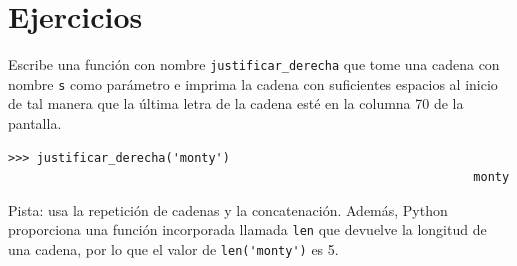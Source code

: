 \documentclass[10pt]{book}
\begin{document}
\section{Ejercicios}

\begin{exercise}

Escribe una función con nombre \verb"justificar_derecha" que tome una cadena
con nombre {\tt s} como parámetro e imprima la cadena con suficientes
espacios al inicio de tal manera que la última letra de la cadena esté en la columna 70
de la pantalla.

\begin{verbatim}
>>> justificar_derecha('monty')
                                                                 monty
\end{verbatim}

Pista: usa la repetición de cadenas y la concatenación.  Además,
Python proporciona una función incorporada llamada {\tt len} que
devuelve la longitud de una cadena, por lo que el valor de \verb"len('monty')" es 5.

\end{exercise}
\end{document}
